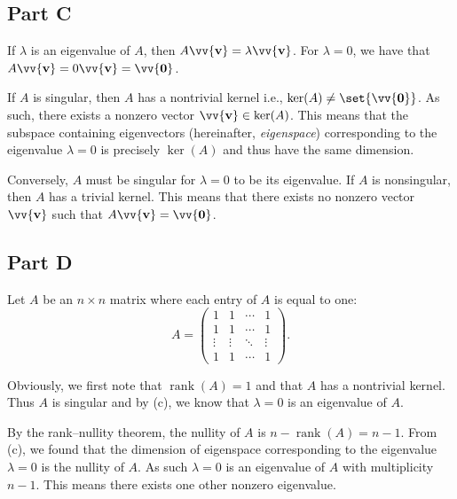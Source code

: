 \documentclass[12pt]{article}
\newcommand{\vect}[1]{\vv{\mathbf{#1}}}
\newcommand{\rank}{\operatorname{rank}}
\begin{document}
\subsection*{Part C}

If $\lambda$ is an eigenvalue of $A$, then $A\vect{v}=\lambda\vect{v}$. For $\lambda=0$, we have that $A\vect{v} = 0\vect{v}=\vect{0}$.

If $A$ is singular, then $A$ has a nontrivial kernel i.e., $\ker(A)\neq\set{\vect{0}}$. As such, there exists a nonzero vector $\vect{v}\in\ker(A)$. This means that the subspace containing eigenvectors (hereinafter, \textit{eigenspace}) corresponding to the eigenvalue $\lambda=0$ is precisely $\ker(A)$ and thus have the same dimension.

Conversely, $A$ must be singular for $\lambda=0$ to be its eigenvalue. If $A$ is nonsingular, then $A$ has a trivial kernel. This means that there exists no nonzero vector $\vect{v}$ such that $A\vect{v}=\vect{0}$.

\subsection*{Part D}

Let $A$ be an $n\times n$ matrix where each entry of $A$ is equal to one:
$$
A=\begin{pmatrix}
    1 & 1 & \cdots & 1 \\
    1 & 1 & \cdots & 1 \\
    \vdots & \vdots & \ddots & \vdots \\
    1 & 1 & \cdots & 1
\end{pmatrix}.
$$

Obviously, we first note that $\rank(A)=1$ and that $A$ has a nontrivial kernel. Thus $A$ is singular and by (c), we know that $\lambda=0$ is an eigenvalue of $A$.

By the rank--nullity theorem, the nullity of $A$ is $n-\rank(A)=n-1$. From (c), we found that the dimension of eigenspace corresponding to the eigenvalue $\lambda=0$ is the nullity of $A$. As such $\lambda=0$ is an eigenvalue of $A$ with multiplicity $n-1$. This means there exists one other nonzero eigenvalue.
\end{document}
